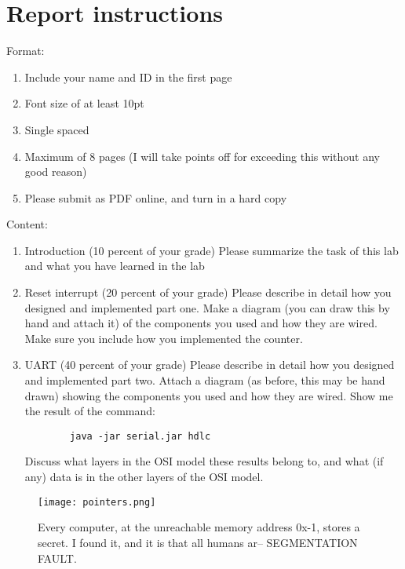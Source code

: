 \documentclass[letterpaper,12pt]{article}
\begin{document}
\section*{Report instructions}
Format:
\begin{enumerate}
   \item Include your name and ID in the first page
   \item Font size of at least 10pt
   \item Single spaced
   \item Maximum of 8 pages (I will take points off for exceeding this without any good reason)
   \item Please submit as PDF online, and turn in a hard copy
\end{enumerate}
Content:
\begin{enumerate}
   \item Introduction (10 percent of your grade) Please summarize the task of this lab and what you have learned in the lab
   \item Reset interrupt (20 percent of your grade) Please describe in detail how you designed
       and implemented part one. Make a diagram (you can draw this by hand and attach it) of the
       components you used and how they are wired. Make sure you include how you implemented the counter.
    \item UART (40 percent of your grade) Please describe in detail how you designed and implemented part
        two. Attach a diagram (as before, this may be hand drawn) showing the components you used and
        how they are wired. Show me the result of the command:
        \begin{lstlisting}
        java -jar serial.jar hdlc
        \end{lstlisting}
        Discuss what layers in the OSI model these results belong to, and what (if any) data is in the other layers of the OSI model.
\end{enumerate}

\begin{figure}[ht!]
	\centering
	\texttt{[image: pointers.png]}
    \caption*{Every computer, at the unreachable memory address 0x-1, stores a secret.  I found it, and it is that all humans ar-- SEGMENTATION FAULT.}
\end{figure}
\end{document}
